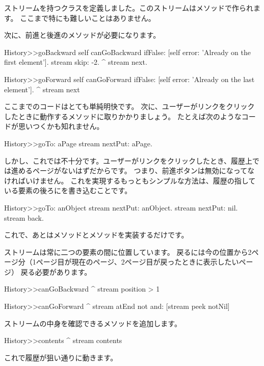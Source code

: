 \documentclass[a4paper,10pt,twoside]{book}
\begin{document}
ストリームを持つクラスを定義しました。このストリームはメソッドで作られます。
ここまで特にも難しいことはありません。

次に、前進と後進のメソッドが必要になります。

\begin{code}{}
History>>goBackward
  self canGoBackward ifFalse: [self error: 'Already on the first element'].
  stream skip: -2.
  ^ stream next.

History>>goForward
  self canGoForward ifFalse: [self error: 'Already on the last element'].
  ^ stream next
\end{code}

ここまでのコードはとても単純明快です。
次に、ユーザーがリンクをクリックしたときに動作するメソッドに取りかかりましょう。
たとえば次のようなコードが思いつくかも知れません。

\begin{code}{}
History>>goTo: aPage
    stream nextPut: aPage.
\end{code}

しかし、これでは不十分です。ユーザーがリンクをクリックしたとき、履歴上では進めるページがないはずだからです。
つまり、前進ボタンは無効になってなければいけません。
これを実現するもっともシンプルな方法は、履歴の指している要素の後ろにを書き込むことです。


\begin{code}{}
History>>goTo: anObject
  stream nextPut: anObject.
  stream nextPut: nil.
  stream back.
\end{code}

これで、あとはメソッドとメソッドを実装するだけです。

ストリームは常に二つの要素の間に位置しています。
戻るには今の位置から2ページ分（1ページ目が現在のページ、2ページ目が戻ったときに表示したいページ）
戻る必要があります。

\begin{code}{}
History>>canGoBackward
  ^ stream position > 1

History>>canGoForward
  ^ stream atEnd not and: [stream peek notNil]
\end{code}

ストリームの中身を確認できるメソッドを追加します。

\begin{code}{}
History>>contents
  ^ stream contents
\end{code}

これで履歴が狙い通りに動きます。
\end{document}
